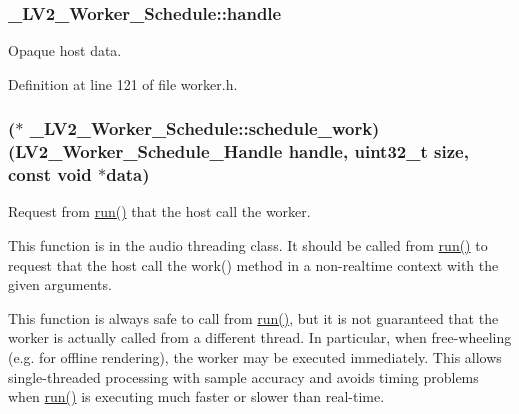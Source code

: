 \subsubsection[{\texorpdfstring{handle}{handle}}]{ \+\_\+\+L\+V2\+\_\+\+Worker\+\_\+\+Schedule\+::handle}\hypertarget{struct___l_v2___worker___schedule_a2ab941993d8d5d0376f079b88a46619c}{}\label{struct___l_v2___worker___schedule_a2ab941993d8d5d0376f079b88a46619c}
Opaque host data. 

Definition at line 121 of file worker.\+h.

\subsubsection[{\texorpdfstring{schedule\+\_\+work}{schedule_work}}]{($\ast$ \+\_\+\+L\+V2\+\_\+\+Worker\+\_\+\+Schedule\+::schedule\+\_\+work) ({\bf L\+V2\+\_\+\+Worker\+\_\+\+Schedule\+\_\+\+Handle} {\bf handle}, {\bf uint32\+\_\+t} {\bf size}, {\bf const} {\bf void} $\ast${\bf data})}\hypertarget{struct___l_v2___worker___schedule_a04216002a3a30b5ccdaeb91a58554d26}{}\label{struct___l_v2___worker___schedule_a04216002a3a30b5ccdaeb91a58554d26}
Request from \hyperlink{namespacewaflib_1_1_task_a859c6336afe027ae782f84b9e49a4f0f}{run()} that the host call the worker.

This function is in the audio threading class. It should be called from \hyperlink{namespacewaflib_1_1_task_a859c6336afe027ae782f84b9e49a4f0f}{run()} to request that the host call the work() method in a non-\/realtime context with the given arguments.

This function is always safe to call from \hyperlink{namespacewaflib_1_1_task_a859c6336afe027ae782f84b9e49a4f0f}{run()}, but it is not guaranteed that the worker is actually called from a different thread. In particular, when free-\/wheeling (e.\+g. for offline rendering), the worker may be executed immediately. This allows single-\/threaded processing with sample accuracy and avoids timing problems when \hyperlink{namespacewaflib_1_1_task_a859c6336afe027ae782f84b9e49a4f0f}{run()} is executing much faster or slower than real-\/time.

